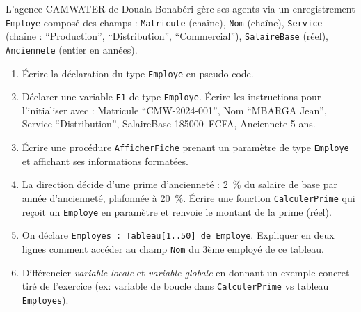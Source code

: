 \documentclass[11pt]{article}
\begin{document}
\begin{exercice}
L'agence CAMWATER de Douala-Bonabéri gère ses agents via un enregistrement \texttt{Employe} composé des champs : \texttt{Matricule} (chaîne), \texttt{Nom} (chaîne), \texttt{Service} (chaîne : ``Production'', ``Distribution'', ``Commercial''), \texttt{SalaireBase} (réel), \texttt{Anciennete} (entier en années).
\begin{enumerate}
    \item Écrire la déclaration du type \texttt{Employe} en pseudo-code.
    \item Déclarer une variable \texttt{E1} de type \texttt{Employe}. Écrire les instructions pour l'initialiser avec : Matricule ``CMW-2024-001'', Nom ``MBARGA Jean'', Service ``Distribution'', SalaireBase \num{185000}~FCFA, Anciennete 5 ans.
    \item Écrire une procédure \texttt{AfficherFiche} prenant un paramètre de type \texttt{Employe} et affichant ses informations formatées.
    \item La direction décide d'une prime d'ancienneté : 2~\% du salaire de base par année d'ancienneté, plafonnée à 20~\%. Écrire une fonction \texttt{CalculerPrime} qui reçoit un \texttt{Employe} en paramètre et renvoie le montant de la prime (réel).
    \item On déclare \texttt{Employes : Tableau[1..50] de Employe}. Expliquer en deux lignes comment accéder au champ \texttt{Nom} du 3ème employé de ce tableau.
    \item Différencier \textit{variable locale} et \textit{variable globale} en donnant un exemple concret tiré de l'exercice (ex: variable de boucle dans \texttt{CalculerPrime} vs tableau \texttt{Employes}).
\end{enumerate}
\end{exercice}
\end{document}
